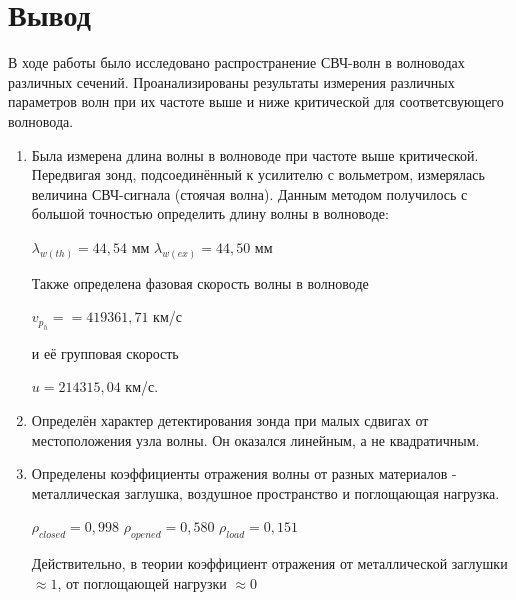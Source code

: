 \documentclass[a4paper]{article}
\begin{document}
\newpage

\section{Вывод}
В ходе работы было исследовано распространение СВЧ-волн в волноводах различных сечений. Проанализированы результаты измерения различных параметров волн при их частоте выше и ниже критической для соответсвующего волновода.
\begin{enumerate}
    \item Была измерена длина волны в волноводе при частоте выше критической. Передвигая зонд, подсоединённый к усилителю с вольметром, измерялась величина СВЧ-сигнала (стоячая волна). Данным методом получилось с большой точностью определить длину волны в волноводе:
    
\begin{center}
    $\lambda_{w(th)} = 44,54$ мм \hspace{2cm} $\lambda_{w(ex)} = 44,50$ мм
\end{center}
    
    Также определена фазовая скорость волны в волноводе
\begin{center}
    $v_p_h = = 419361,71$ км/с
\end{center}
     и её групповая скорость
     \begin{center}
          $u = 214315,04$ км/с.
     \end{center}
     
\item
    Определён характер детектирования зонда при малых сдвигах от местоположения узла волны. Он оказался линейным, а не квадратичным.
    
\item
    Определены коэффициенты отражения волны от разных материалов - металлическая заглушка, воздушное пространство и поглощающая нагрузка.
  \begin{center}
        $\rho_{closed} = 0,998$ \hspace{1cm} $\rho_{opened} = 0,580$ \hspace{1cm} $\rho_{load} = 0,151$
    \end{center}  
    Действительно, в теории коэффициент отражения от металлической заглушки $\approx 1$, от поглощающей нагрузки $\approx 0$


\end{enumerate}
\end{document}
